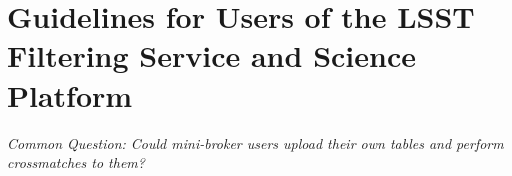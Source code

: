 \section{Guidelines for Users of the LSST Filtering Service and Science Platform}\label{sec:mini_broker}

{\it Common Question: Could mini-broker users upload their own tables and perform crossmatches to them?} 